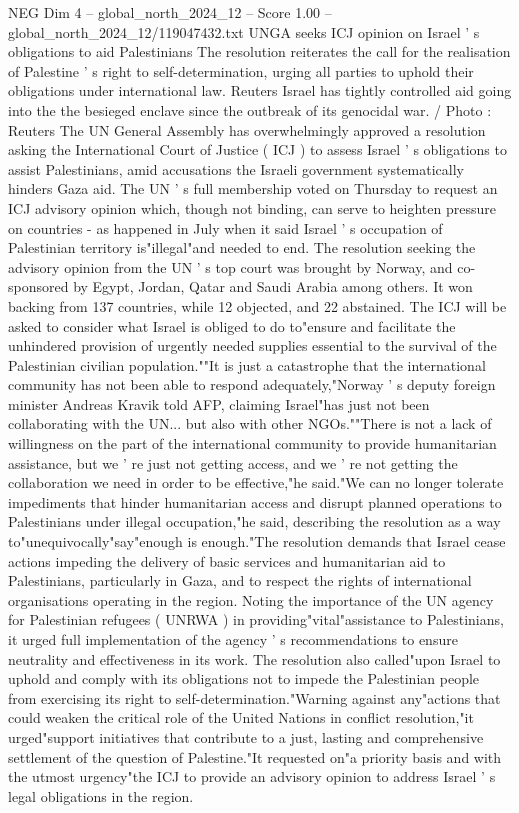 \begin{textsample}{NEG Dim 4 – global\_north\_2024\_12 – Score 1.00 – global\_north\_2024\_12/119047432.txt}  \label{ex:f4_neg_132}
UNGA seeks ICJ opinion on Israel ' s obligations to aid Palestinians The resolution reiterates the call for the realisation of Palestine ' s right to self-determination, urging all parties to uphold their obligations under international law.
Reuters Israel has tightly controlled aid going into the the besieged enclave since the outbreak of its genocidal war. / Photo : Reuters The UN General Assembly has overwhelmingly approved a resolution asking the International Court of Justice ( ICJ ) to assess Israel ' s obligations to assist Palestinians, amid accusations the Israeli government systematically hinders Gaza aid.
The UN ' s full membership voted on Thursday to request an ICJ advisory opinion which, though not binding, can serve to heighten pressure on countries - as happened in July when it said Israel ' s occupation of Palestinian territory is"illegal"and needed to end.
The resolution seeking the advisory opinion from the UN ' s top court was brought by Norway, and co-sponsored by Egypt, Jordan, Qatar and Saudi Arabia among others.
It won backing from 137 countries, while 12 objected, and 22 abstained.
The ICJ will be asked to consider what Israel is obliged to do to"ensure and facilitate the unhindered provision of urgently needed supplies essential to the survival of the Palestinian civilian population.""It is just a catastrophe that the international community has not been able to respond adequately,"Norway ' s deputy foreign minister Andreas Kravik told AFP, claiming Israel"has just not been collaborating with the UN... but also with other NGOs.""There is not a lack of willingness on the part of the international community to provide humanitarian assistance, but we ' re just not getting access, and we ' re not getting the collaboration we need in order to be effective,"he said."We can no longer tolerate impediments that hinder humanitarian access and disrupt planned operations to Palestinians under illegal occupation,"he said, describing the resolution as a way to"unequivocally"say"enough is enough."The resolution demands that Israel cease actions impeding the delivery of basic services and humanitarian aid to Palestinians, particularly in Gaza, and to respect the rights of international organisations operating in the region.
Noting the importance of the UN agency for Palestinian refugees ( UNRWA ) in providing"vital"assistance to Palestinians, it urged full implementation of the agency ' s recommendations to ensure neutrality and effectiveness in its work.
The resolution also called"upon Israel to uphold and comply with its obligations not to impede the Palestinian people from exercising its right to self-determination."Warning against any"actions that could weaken the critical role of the United Nations in conflict resolution,"it urged"support initiatives that contribute to a just, lasting and comprehensive settlement of the question of Palestine."It requested on"a priority basis and with the utmost urgency"the ICJ to provide an advisory opinion to address Israel ' s legal obligations in the region.

\end{textsample}
